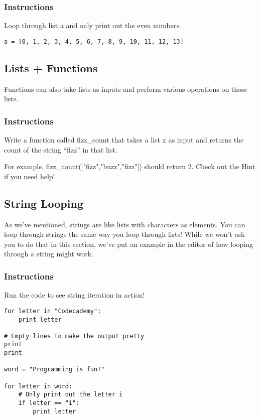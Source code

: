 \documentclass[12pt,a4paper,final,twoside,onecolumn,titlepage]{book}
\begin{document}
\subsubsection{Instructions}

Loop through list a and only print out the even numbers.
\begin{lstlisting}
a = [0, 1, 2, 3, 4, 5, 6, 7, 8, 9, 10, 11, 12, 13]
\end{lstlisting}

\subsection{Lists + Functions}

Functions can also take lists as inputs and perform various operations on those lists.
\subsubsection{Instructions}

Write a function called fizz\_count that takes a list x as input and returns the count of the string “fizz” in that list.

For example, fizz\_count(["fizz","buzz","fizz"]) should return 2. Check out the Hint if you need help!

\subsection{String Looping}

As we've mentioned, strings are like lists with characters as elements. You can loop through strings the same way you loop through lists! While we won't ask you to do that in this section, we've put an example in the editor of how looping through a string might work.
\subsubsection{Instructions}

Run the code to see string iteration in action!

\begin{lstlisting}
for letter in "Codecademy":
    print letter
    
# Empty lines to make the output pretty
print
print

word = "Programming is fun!"

for letter in word:
    # Only print out the letter i
    if letter == "i":
        print letter
\end{lstlisting}
\end{document}

